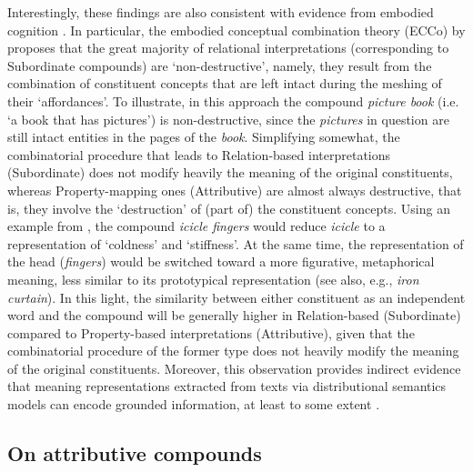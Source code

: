 \documentclass[output=paper]{langsci/langscibook}
\begin{document}
Interestingly, these findings are also consistent with evidence from embodied cognition \citep{louwerse2008}. In particular, the embodied conceptual combination theory ({ECC}o) by \cite{lynott2009} proposes that the great majority of relational interpretations (corresponding to Subordinate compounds) are `non-destructive', namely, they result from the combination of constituent concepts that are left intact during the meshing of their `affordances'. To illustrate, in this approach the compound \emph{picture book} (i.e. `a book that has pictures’) is non-destructive, since the \emph{pictures} in question are still intact entities in the pages of the \emph{book}. Simplifying somewhat, the combinatorial procedure that leads to Relation-based interpretations (Subordinate) does not modify heavily the meaning of the original constituents, whereas Property-mapping ones (Attributive) are almost always destructive, that is, they involve the `destruction' of (part of) the constituent concepts. Using an example from \cite{lynott2009}, the compound \emph{icicle fingers} would reduce \emph{icicle} to a representation of `coldness' and `stiffness'. At the same time, the representation of the head (\emph{fingers}) would be switched toward a more figurative, metaphorical meaning, less similar to its prototypical representation (see also, e.g., \emph{iron curtain}). In this light, the similarity between either constituent as an independent word and the compound will be generally higher in Relation-based (Subordinate) compared to Property-based interpretations (Attributive), given that the combinatorial procedure of the former type does not heavily modify the meaning of the original constituents. Moreover, this observation provides indirect evidence that meaning representations extracted from texts via distributional semantics models can encode grounded information, at least to some extent \citep{louwerse2011}.

\subsection{On attributive compounds}
\end{document}
